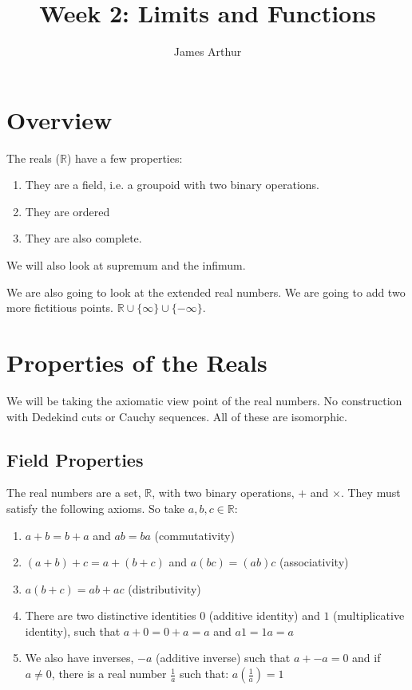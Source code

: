 \documentclass{article}
\title{Week 2: Limits and Functions}
\author{James Arthur}
\newcommand{\R}{\mathbb{R}}
\begin{document}
\maketitle
\tableofcontents
\newpage



\section{Overview}

The reals ($\R$) have a few properties:
\begin{enumerate}
  \item They are a field, i.e. a groupoid with {\color{blue}two binary operations}.
  \item They are ordered
  \item They are also {\color{blue}complete}.
\end{enumerate}
We will also look at {\color{blue}supremum} and the {\color{blue}infimum}.

We are also going to look at the {\color{blue}extended real numbers}. We are going to add two more fictitious points. $\R \cup \{ \infty \} \cup \{ -\infty \}$.

\section{Properties of the Reals}
We will be taking the axiomatic view point of the real numbers. No construction with {\color{blue}Dedekind cuts} or {\color{blue}Cauchy sequences}. All of these are isomorphic.

\subsection{Field Properties}
The real numbers are a set, $\R$, with two binary operations, $+$ and $\times$. They must satisfy the following axioms. So take $a, b, c \in \R$:
\begin{enumerate}
  \item $a + b = b + a$ and $ab = ba$ ({\color{blue}commutativity})
  \item $(a + b) + c = a + (b + c)$ and $a(bc) = (ab)c$ ({\color{blue}associativity})
  \item $a(b + c) = ab + ac$ ({\color{blue}distributivity})
  \item There are two distinctive identities $0$ ({\color{blue}additive identity}) and $1$ ({\color{blue}multiplicative identity}), such that $a + 0 = 0 + a = a$ and $a1 = 1a = a$
  \item We also have inverses, $-a$ ({\color{blue}additive inverse}) such that $a + -a = 0$ and if $a \neq 0$, there is a real number $\frac{1}{a}$ such that: $a(\frac{1}{a})=1$
\end{enumerate}
\end{document}
